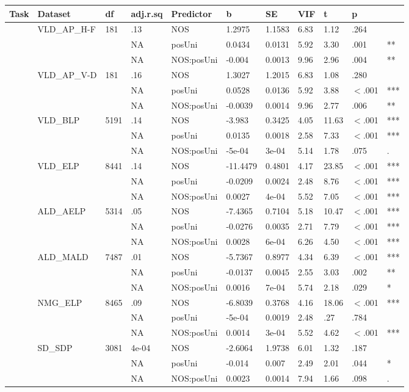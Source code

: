 \begin{table}[ht]
\centering
\begingroup\normalsize
\begin{tabular}{lllllllllll}
  \hline
Task & Dataset & df & adj.r.sq & Predictor & b & SE & VIF & t & p &  \\ 
  \hline
 & VLD\_AP\_H-F & 181 & .13 & NOS & 1.2975 & 1.1583 & 6.83 & 1.12 & .264 &   \\ 
   &  &  & NA & posUni & 0.0434 & 0.0131 & 5.92 & 3.30 & .001 & ** \\ 
   &  &  & NA & NOS:posUni & -0.004 & 0.0013 & 9.96 & 2.96 & .004 & ** \\ 
   & VLD\_AP\_V-D & 181 & .16 & NOS & 1.3027 & 1.2015 & 6.83 & 1.08 & .280 &   \\ 
   &  &  & NA & posUni & 0.0528 & 0.0136 & 5.92 & 3.88 & $<$.001 & *** \\ 
   &  &  & NA & NOS:posUni & -0.0039 & 0.0014 & 9.96 & 2.77 & .006 & ** \\ 
   & VLD\_BLP & 5191 & .14 & NOS & -3.983 & 0.3425 & 4.05 & 11.63 & $<$.001 & *** \\ 
   &  &  & NA & posUni & 0.0135 & 0.0018 & 2.58 & 7.33 & $<$.001 & *** \\ 
   &  &  & NA & NOS:posUni & -5e-04 & 3e-04 & 5.14 & 1.78 & .075 & . \\ 
   & VLD\_ELP & 8441 & .14 & NOS & -11.4479 & 0.4801 & 4.17 & 23.85 & $<$.001 & *** \\ 
   &  &  & NA & posUni & -0.0209 & 0.0024 & 2.48 & 8.76 & $<$.001 & *** \\ 
   &  &  & NA & NOS:posUni & 0.0027 & 4e-04 & 5.52 & 7.05 & $<$.001 & *** \\ 
   & ALD\_AELP & 5314 & .05 & NOS & -7.4365 & 0.7104 & 5.18 & 10.47 & $<$.001 & *** \\ 
   &  &  & NA & posUni & -0.0276 & 0.0035 & 2.71 & 7.79 & $<$.001 & *** \\ 
   &  &  & NA & NOS:posUni & 0.0028 & 6e-04 & 6.26 & 4.50 & $<$.001 & *** \\ 
   & ALD\_MALD & 7487 & .01 & NOS & -5.7367 & 0.8977 & 4.34 & 6.39 & $<$.001 & *** \\ 
   &  &  & NA & posUni & -0.0137 & 0.0045 & 2.55 & 3.03 & .002 & ** \\ 
   &  &  & NA & NOS:posUni & 0.0016 & 7e-04 & 5.74 & 2.18 & .029 & * \\ 
   & NMG\_ELP & 8465 & .09 & NOS & -6.8039 & 0.3768 & 4.16 & 18.06 & $<$.001 & *** \\ 
   &  &  & NA & posUni & -5e-04 & 0.0019 & 2.48 & .27 & .784 &   \\ 
   &  &  & NA & NOS:posUni & 0.0014 & 3e-04 & 5.52 & 4.62 & $<$.001 & *** \\ 
   & SD\_SDP & 3081 & 4e-04 & NOS & -2.6064 & 1.9738 & 6.01 & 1.32 & .187 &   \\ 
   &  &  & NA & posUni & -0.014 & 0.007 & 2.49 & 2.01 & .044 & * \\ 
   &  &  & NA & NOS:posUni & 0.0023 & 0.0014 & 7.94 & 1.66 & .098 & . \\ 
   \hline
\end{tabular}
\endgroup
\end{table}
